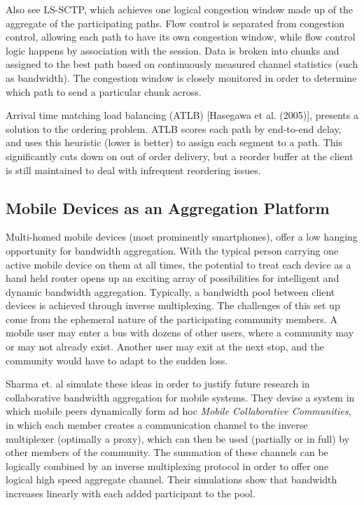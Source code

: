 \documentclass[12pt]{article}
\begin{document}
	Also see LS-SCTP, which achieves one logical congestion window made up of the aggregate of the participating paths. Flow control is separated from congestion control, allowing each path to have its own congestion window, while flow control logic happens by association with the session. Data is broken into chunks and assigned to the best path based on continuously measured channel statistics (such as bandwidth). The congestion window is closely monitored in order to determine which path to send a particular chunk across\cite{AbdElAl20041012}.

	Arrival time matching load balancing (ATLB) [Hasegawa et al. (2005)], presents a solution to the ordering problem. ATLB scores each path by end-to-end delay, and uses this heuristic (lower is better) to assign each segment to a path. This significantly cuts down on out of order delivery, but a reorder buffer at the client is still maintained to deal with infrequent reordering issues.

\subsection{Mobile Devices as an Aggregation Platform}

	Multi-homed mobile devices (most prominently smartphones), offer a low hanging opportunity for bandwidth aggregation. With the typical person carrying one active mobile device on them at all times, the potential to treat each device as a hand held router opens up an exciting array of possibilities for intelligent and dynamic bandwidth aggregation. Typically, a bandwidth pool between client devices is achieved through inverse multiplexing. The challenges of this set up come from the ephemeral nature of the participating community members. A mobile user may enter a bus with dozens of other users, where a community may or may not already exist. Another user may exit at the next stop, and the community would have to adapt to the sudden loss.

	Sharma et. al simulate these ideas in order to justify future research in collaborative bandwidth aggregation for mobile systems. They devise a system in which mobile peers dynamically form ad hoc {\it Mobile Collaborative Communities}, in which each member creates a communication channel to the inverse multiplexer (optimally a proxy), which can then be used (partially or in full) by other members of the community. The summation of these channels can be logically combined by an inverse multiplexing protocol in order to offer one logical high speed aggregate channel\cite{1363842}. Their simulations show that bandwidth increases linearly with each added participant to the pool\cite{1363842}.
\end{document}
